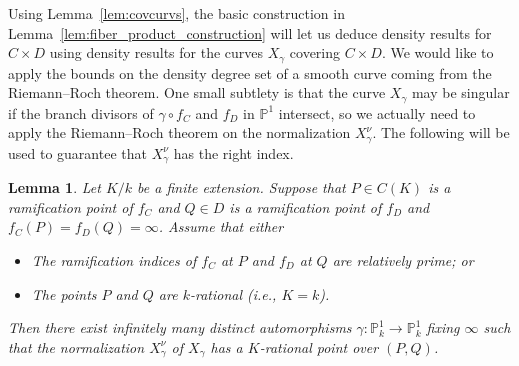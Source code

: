 \documentclass[a4paper,11pt]{amsart}
\theoremstyle{plain}
\newtheorem{lemma}[thm]{Lemma}
\theoremstyle{remark}
\renewcommand{\P}{\mathbb{P}}
\begin{document}
Using Lemma~\ref{lem:covcurvs}, the basic construction in Lemma~\ref{lem:fiber_product_construction} will let us deduce density results for \(C \times D\) using density results for the curves \(X_\gamma\) covering \(C \times D\).
We would like to apply the bounds on the density degree set of a smooth curve coming from the Riemann--Roch theorem.  
One small subtlety is that the curve \(X_\gamma\) may be singular if the branch divisors of \(\gamma \circ f_C\) and \(f_D\) in \(\P^1\) intersect,
so we actually need to apply the Riemann--Roch theorem on the normalization \(X_\gamma^\nu\).  The following will be used to guarantee that \(X_\gamma^\nu\) has the right index.

\begin{lemma}\label{lem:split_over_node}
Let \(K/k\) be a finite extension.
Suppose that \(P \in C(K)\) is a ramification point of \(f_C\) and \(Q \in D\) is a ramification point of \(f_D\) and \(f_C(P) = f_D(Q) = \infty\).  Assume that either 
\begin{itemize}
    \item The ramification indices of \(f_C\) at \(P\) and \(f_D\) at \(Q\) are relatively prime; or
    \item The points \(P\) and \(Q\) are \(k\)-rational (i.e., \(K = k\)).
\end{itemize}
Then there exist infinitely many distinct automorphisms \(\gamma \colon \P_k^1 \to \P_k^1\) fixing \(\infty\) such that the normalization \(X_\gamma^\nu\) of \(X_\gamma\) has a \(K\)-rational point over \((P,Q)\). 
\end{lemma}
\end{document}
